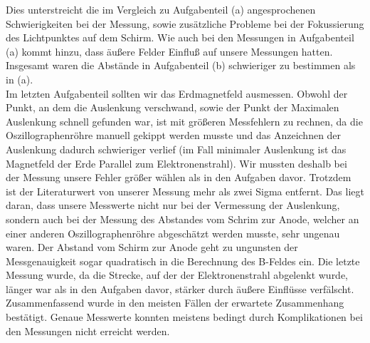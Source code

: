 \documentclass[12pt]{scrartcl}
\begin{document}
Dies unterstreicht die im Vergleich zu Aufgabenteil (a) angesprochenen Schwierigkeiten bei der Messung, sowie zusätzliche Probleme bei der Fokussierung des Lichtpunktes auf dem Schirm.
Wie auch bei den Messungen in Aufgabenteil (a) kommt hinzu, dass äußere Felder Einfluß auf unsere Messungen hatten.
Insgesamt waren die Abstände in Aufgabenteil (b) schwieriger zu bestimmen als in (a).\\
Im letzten Aufgabenteil sollten wir das Erdmagnetfeld ausmessen. Obwohl der Punkt, an dem die Auslenkung verschwand, sowie der Punkt der Maximalen Auslenkung schnell gefunden war, ist mit größeren Messfehlern zu rechnen, da die Oszillographenröhre manuell gekippt werden musste und das Anzeichnen der Auslenkung dadurch schwieriger verlief (im Fall minimaler Auslenkung ist das Magnetfeld der Erde Parallel zum Elektronenstrahl). Wir mussten deshalb bei der Messung unsere Fehler größer wählen als in den Aufgaben davor. Trotzdem ist der Literaturwert von unserer Messung mehr als  zwei Sigma entfernt. Das liegt daran, dass unsere Messwerte nicht nur bei der Vermessung der Auslenkung, sondern auch bei der Messung des Abstandes vom Schrim zur Anode, welcher an einer anderen Oszillographenröhre abgeschätzt werden musste, sehr ungenau waren.
Der Abstand vom Schirm zur Anode geht zu ungunsten der Messgenauigkeit sogar quadratisch in die Berechnung des B-Feldes ein. Die letzte Messung wurde, da die Strecke, auf der der Elektronenstrahl abgelenkt wurde, länger war als in den Aufgaben davor, stärker durch äußere Einflüsse verfälscht.\\
Zusammenfassend wurde in den meisten Fällen der erwartete Zusammenhang bestätigt. Genaue Messwerte konnten meistens bedingt durch Komplikationen bei den Messungen nicht erreicht werden.
 
\end{document}
